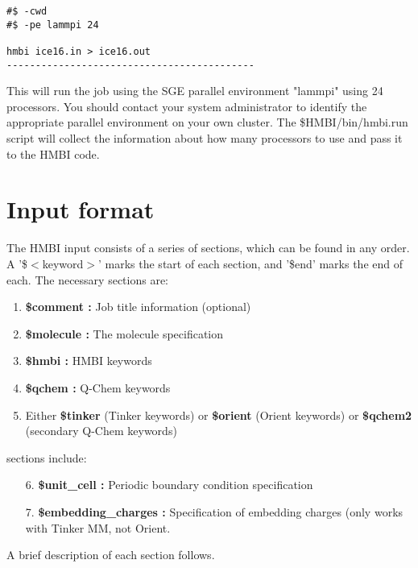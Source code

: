 \documentclass[11pt,letterpaper]{article}
\begin{document}
\begin{spacing}{1.0}
\begin{verbatim}
#$ -cwd
#$ -pe lammpi 24

hmbi ice16.in > ice16.out
-------------------------------------------
\end{verbatim}

This will run the job using the SGE parallel environment "lammpi" using
24 processors.  You should contact your system administrator to identify
the appropriate parallel environment on your own cluster.
The \$HMBI/bin/hmbi.run script will collect the information about how many
processors to use and pass it to the HMBI code.  


\section{Input format}

The HMBI input consists of a series of sections, which can be found in 
any order. A '\$$<$keyword$>$' marks the start of each section, and '\$end' 
marks the end of each.  The necessary sections are:

\begin{enumerate}
\item {\bf \$comment :} Job title information (optional)

\item {\bf \$molecule :} The molecule specification

\item {\bf \$hmbi :} HMBI keywords

\item {\bf \$qchem :} Q-Chem keywords

\item Either {\bf \$tinker} (Tinker keywords) or {\bf \$orient}
  (Orient keywords) or {\bf \$qchem2} (secondary Q-Chem keywords)
\end{enumerate}

 sections include:

\begin{enumerate}

\item[6.] {\bf \$unit\_cell :} Periodic boundary condition specification

\item[7.] {\bf \$embedding\_charges :} Specification of embedding charges
  (only works with Tinker MM, not Orient.

\end{enumerate}

\noindent A brief description of each section follows.


\end{spacing}
\end{document}
